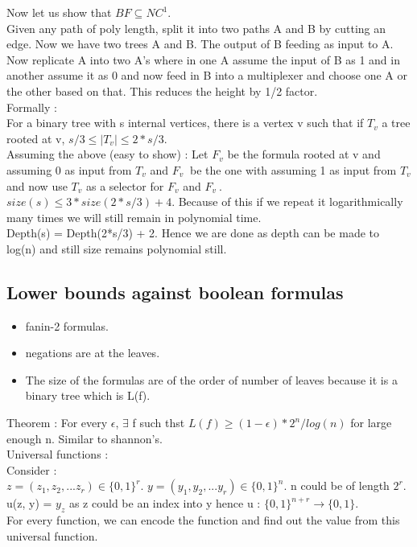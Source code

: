 \documentclass[solution,addpoints,12pt]{exam}
\begin{document}
Now let us show that $BF \subseteq {NC}^1$.\\
Given any path of poly length, split it into two paths
A and B by cutting an edge. Now we have two trees A and B.
The output of B feeding as input to A. Now replicate A into
two A's where in one A assume the input of B as 1 and in
another assume it as 0 and now feed in B into a multiplexer
and choose one A or the other based on that. This reduces the height
by 1/2 factor.\\

Formally :\\
For a binary tree with s internal vertices, there is a vertex v
such that if $T_v$ a tree rooted at v, $s/3 \le |T_v| \le 2*s/3$.\\
Assuming the above (easy to show) : Let $F_v$ be the formula rooted
at v  and assuming 0 as input from $T_v$ and $F_v~$ be the one with
assuming 1 as input from $T_v$ and now use $T_v$ as a selector
for $F_v$ and $F_v~$.\\
$size(s) \le 3*size(2*s/3) + 4$. Because of this if we
repeat it logarithmically many times
we will still remain in polynomial time.\\

Depth(s) = Depth(2*s/3) + 2. Hence we are done as depth
can be made to log(n) and still size remains polynomial still.\\

\subsection{Lower bounds against boolean formulas}
\begin{itemize}
\item fanin-2 formulas.
\item negations are at the leaves.
\item The size of the formulas are of the order of number of leaves
because it is a binary tree which is L(f).
\end{itemize}
Theorem : For every $\epsilon$, $\exists$ f such thst
$L(f) \ge (1 - \epsilon)*2^n/log(n)$ for large enough n. Similar
to shannon's.\\
Universal functions :\\
Consider :\\
$z = (z_1, z_2, ... z_r) \in {\{0, 1\}}^r$.
$y = (y_1, y_2, ... y_r) \in {\{0, 1\}}^n$.
n could be of length $2^r$.\\
u(z, y) = $y_z$ as z could be an index into y
hence u : ${\{0, 1\}}^{n+r} \rightarrow \{0, 1\}$.\\
For every function, we can encode the function and find out
the value from this universal function.\\
\end{document}
